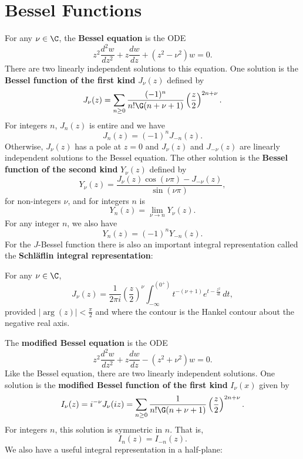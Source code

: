   \section{Bessel Functions}\label{append:Bessel_Functions}
    For any $\nu \in \C$, the \textbf{Bessel equation} is the ODE
    \[
      z^{2}\frac{d^{2}w}{dz^{2}}+z\frac{dw}{dz}+(z^{2}-\nu^{2})w = 0.
    \]
    There are two linearly independent solutions to this equation. One solution is the \textbf{Bessel function of the first kind} $J_{\nu}(z)$ defined by
    \[
      J_{\nu}(z) = \sum_{n \ge 0}\frac{(-1)^{n}}{n!\G(n+\nu+1)}\left(\frac{z}{2}\right)^{2n+\nu}.
    \]
    For integers $n$, $J_{n}(z)$ is entire and we have
    \[
      J_{n}(z) = (-1)^{n}J_{-n}(z).
    \]
    Otherwise, $J_{\nu}(z)$ has a pole at $z = 0$ and $J_{\nu}(z)$ and $J_{-\nu}(z)$ are linearly independent solutions to the Bessel equation. The other solution is the \textbf{Bessel function of the second kind} $Y_{\nu}(z)$ defined by
    \[
      Y_{\nu}(z) = \frac{J_{\nu}(z)\cos(\nu\pi)-J_{-\nu}(z)}{\sin(\nu\pi)},
    \]
    for non-integers $\nu$, and for integers $n$ is
    \[
      Y_{n}(z) = \lim_{\nu \to n}Y_{\nu}(z).
    \]
    For any integer $n$, we also have
    \[
      Y_{n}(z) = (-1)^{n}Y_{-n}(z).
    \]
    For the $J$-Bessel function there is also an important integral representation called the \textbf{Schl\"aflin integral representation}:

    \begin{proposition}
      For any $\nu \in \C$,
      \[
        J_{\nu}(z) = \frac{1}{2\pi i}\left(\frac{z}{2}\right)^{\nu}\int_{-\infty}^{(0^{+})}t^{-(\nu+1)}e^{t-\frac{z^{2}}{4t}}\,dt,
      \]
      provided $|\arg(z)| < \frac{\pi}{2}$ and where the contour is the Hankel contour about the negative real axis.
    \end{proposition}

    The \textbf{modified Bessel equation} is the ODE
    \[
      z^{2}\frac{d^{2}w}{dz^{2}}+z\frac{dw}{dz}-(z^{2}+\nu^{2})w = 0.
    \]
    Like the Bessel equation, there are two linearly independent solutions. One solution is the \textbf{modified Bessel function of the first kind} $I_{\nu}(x)$ given by
    \[
      I_{\nu}(z) = i^{-\nu}J_{\nu}(iz) = \sum_{n \ge 0}\frac{1}{n!\G(n+\nu+1)}\left(\frac{z}{2}\right)^{2n+\nu}.
    \]
    For integers $n$, this solution is symmetric in $n$. That is,
    \[
      I_{n}(z) = I_{-n}(z).
    \]
    We also have a useful integral representation in a half-plane:

